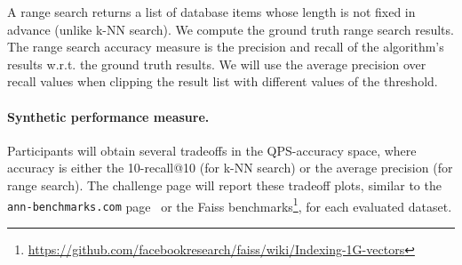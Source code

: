 \fi


A range search returns a list of database items whose length is not fixed in advance (unlike k-NN search).
We compute the ground truth range search results. 
The range search accuracy measure is the precision and recall of the algorithm's results w.r.t. the ground truth results.
We will use the average precision over recall values when clipping the result list with different values of the threshold.


\iffalse 

\begin{definition}[{\bf Range search average precision at $\epsilon$}]
  \label{def:rangeaccuracy}
  For a query vector $q$ over dataset $P$, suppose that (a) $G
  \subseteq P$ is the set of actual nearest neighbors within range $\epsilon$ 
  of the query in in $P$, and
  (b) $X \subseteq P$ is the output of a ANNS range query to an index
  for range $\epsilon'$. 
  Then the precision in $p=\frac{|X \cap G|}{|X|}$ and recall is $r=\frac{|X \cap G|}{|G|}$. 
  The accuracy measure that we use is the average precision while sweeping over $\epsilon'$ values.
\end{definition}

\fi




\paragraph{Synthetic performance measure.}


Participants will obtain several tradeoffs in the QPS-accuracy space,
where accuracy is either the 10-recall@10 (for k-NN search) or the
average precision (for range search).  
The challenge page will report
these tradeoff plots, similar to the {\tt ann-benchmarks.com}
page~\cite{Benchmark} or the Faiss benchmarks\footnote{\url{https://github.com/facebookresearch/faiss/wiki/Indexing-1G-vectors}},
for each evaluated dataset.

